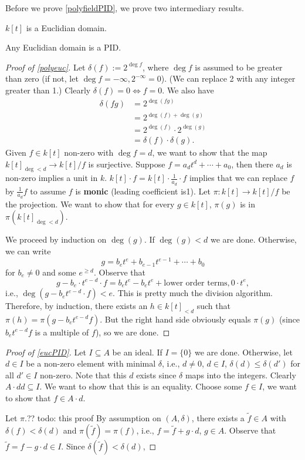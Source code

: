 Before we prove \cref{polyfieldPID}, we prove two intermediary results.
\begin{lemma}\label{polyeuc} 
    $k[t]$ is a Euclidian domain. 
\end{lemma}
\begin{lemma}\label{eucPID} 
   Any Euclidian domain is a PID. 
\end{lemma}
\begin{proof}[Proof of \cref{polyeuc}]
    Let $\delta (f) := 2^{ \deg f}$, where $\deg f$ is assumed to be greater than zero (if not, let $\deg f = - \infty, 2^{- \infty}=0$). (We can replace 2 with any integer greater than 1.) Clearly $\delta (f)=0 \iff f=0$. We also have
    \begin{align*}
        \delta (fg)&=2 ^{\deg (fg)}\\
                   &=2 ^{\deg(f)+\deg(g)}\\
                   &=2 ^{\deg(f) }\cdot 2 ^{\deg(g)}\\
                   &=\delta (f)\cdot \delta (g).
    \end{align*}Given $f \in k[t]$ non-zero with $\deg f =d$, we want to show that the map $k[t] _{ \deg < d}\to  k[t] / f$ is surjective. Suppose $f = a_d t^d + \cdots + a_0$, then there $a_d$ is non-zero implies a unit in $k$. $k[t] \cdot f = k[t] \cdot  \frac{1}{a_d}\cdot f$ implies that we can replace $f$ by $\frac{1}{a_d}f$ to assume $f$ is \textbf{monic} (leading coefficient is1). Let $\pi \colon k[t] \to k[t] / f$ be the projection. We want to show that for every $g \in k[t]$, $\pi(g)$ is in $\pi \left( k[t]  _{\deg < d}\right) $.

    We proceed by induction on $\deg (g)$. If $\deg(g) < d$ we are done. Otherwise, we can write \[
    g = b_e t^e + b _{e-1}t ^{e-1}+ \cdots  + b_0
    \] for $b_e\neq 0$ and some $e ^{\geq d}$. Observe that \[
    g -b_e \cdot t ^{e-d}\cdot f = b_e t^e - b_e t^e +  \text{lower order terms}, 0 \cdot  t^e,
\] i.e., $\deg(g -b_e t^{e- d}\cdot f)<e$. This is pretty much the division algorithm. Therefore, by induction, there exists an $h \in k[t] _{<d}$ such that $\pi(h)= \pi(g-b _e t ^{e-d}f)$. But the right hand side obviously equals $\pi(g)$ (since $b_e t ^{e-d}f$ is a multiple of $f$), so we are done.
\end{proof}
\begin{proof}[Proof of \cref{eucPID}]
    Let $I \subseteq A$ be an ideal. If $I = \{0\} $ we are done. Otherwise, let $d \in I$ be a non-zero element with minimal $\delta $, i.e., $d\neq 0$, $d \in I$, $\delta (d) \leq \delta (d')$ for all $d' \in I$ non-zero. Note that this $d$ exists since $\delta $ maps into the integers. Clearly $A \cdot  dd \subseteq I$. We want to show that this is an equality.  Choose some $f \in I$, we want to show that $f \in A \cdot d$. 

    Let $\pi $.?? {\color{red}todo: this proof}  By assumption on $(A, \delta )$, there exists a $\widetilde  f \in A$ with $\delta (f) < \delta (d)$ and $\pi ( \widetilde  f) = \pi(f)$, i.e., $f = \widetilde  f + g \cdot  d$, $g \in A$. Observe that $\widetilde  f = f - g \cdot d \in I$. Since $\delta ( \widetilde  f) < \delta (d)$, 
\end{proof}
